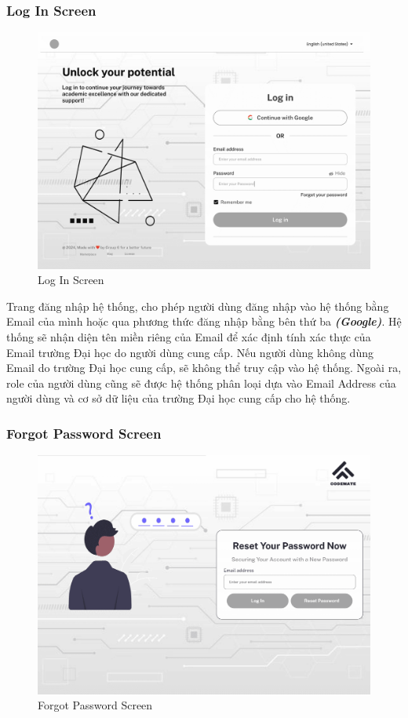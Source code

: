 \subsubsection{Log In Screen}
\begin{figure}[H]
    \centering
    \includegraphics[width=0.7\linewidth]{Images/figmaDesign/Sign In Screen.png}
    \caption{Log In Screen}
    \label{fig:enter-label}
\end{figure}
Trang đăng nhập hệ thống, cho phép người dùng đăng nhập vào hệ thống bằng Email của mình hoặc qua phương thức đăng nhập bằng bên thứ ba \textbf{\textit{(Google)}}. Hệ thống sẽ nhận diện tên miền riêng của Email để xác định tính xác thực của Email trường Đại học do người dùng cung cấp. Nếu người dùng không dùng Email do trường Đại học cung cấp, sẽ không thể truy cập vào hệ thống. Ngoài ra, role của người dùng cũng sẽ được hệ thống phân loại dựa vào Email Address của người dùng và cơ sở dữ liệu của trường Đại học cung cấp cho hệ thống. 
\subsubsection{Forgot Password Screen}
\begin{figure}[H]
    \centering
    \includegraphics[width=0.7\linewidth]{Images/figmaDesign/Forgot Password Screen.png}
    \caption{Forgot Password Screen}
    \label{fig:enter-label}
\end{figure}
